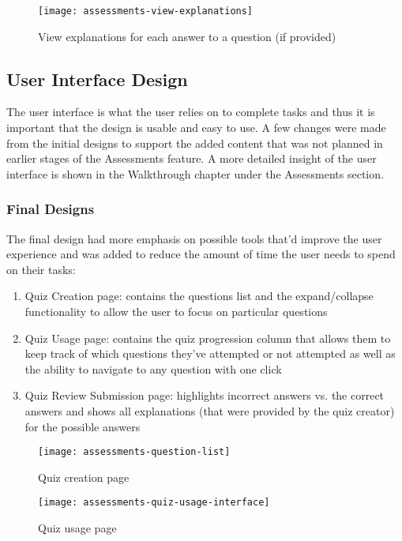 \begin{figure}[h!]
	\centering
	\texttt{[image: assessments-view-explanations]}
	\caption{View explanations for each answer to a question (if provided)}
\end{figure}


\subsection{User Interface Design}
The user interface is what the user relies on to complete tasks and thus it is important that the design is usable and easy to use. A few changes were made from the initial designs to support the added content that was not planned in earlier stages of the Assessments feature. A more detailed insight of the user interface is shown in the Walkthrough chapter under the Assessments section. 

\subsubsection{Final Designs}
The final design had more emphasis on possible tools that'd improve the user experience and was added to reduce the amount of time the user needs to spend on their tasks: 

\begin{enumerate}
	\item Quiz Creation page: contains the questions list and the expand/collapse functionality to allow the user to focus on particular questions
	\item Quiz Usage page: contains the quiz progression column that allows them to keep track of which questions they've attempted or not attempted as well as the ability to navigate to any question with one click
	\item Quiz Review Submission page: highlights incorrect answers vs. the correct answers and shows all explanations (that were provided by the quiz creator) for the possible answers
\end{enumerate}

\begin{figure}[h!]
	\centering
	\texttt{[image: assessments-question-list]}
	\caption{Quiz creation page}
\end{figure}

\begin{figure}[h!]
	\centering
	\texttt{[image: assessments-quiz-usage-interface]}
	\caption{Quiz usage page}
\end{figure}

